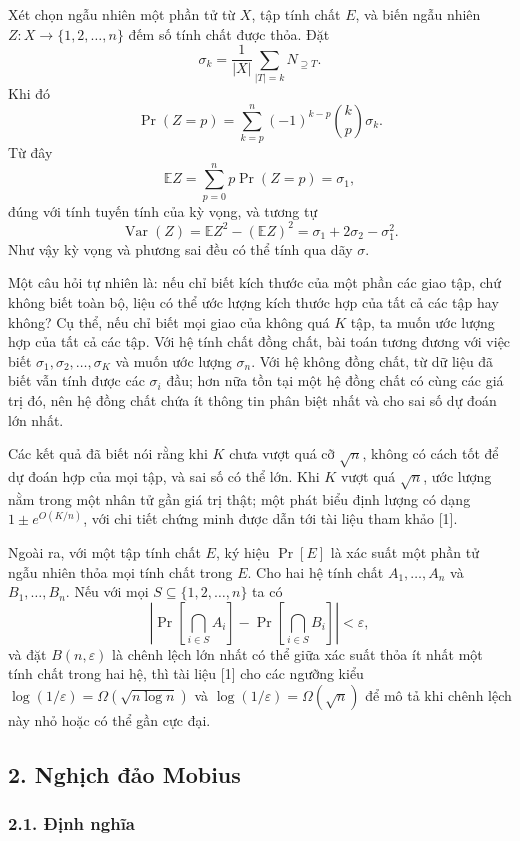\documentclass[11pt]{article}
\begin{document}
Xét chọn ngẫu nhiên một phần tử từ \(X\), tập tính chất \(E\), và biến ngẫu
nhiên \(Z:X\to\{1,2,\ldots,n\}\) đếm số tính chất được thỏa. Đặt
\[
\sigma_k=\frac1{|X|}\sum_{|T|=k}N_{\supseteq T}.
\]
Khi đó
\[
\Pr(Z=p)=\sum_{k=p}^n(-1)^{k-p}\binom kp\sigma_k.
\]
Từ đây
\[
\mathbb E Z=\sum_{p=0}^n p\Pr(Z=p)=\sigma_1,
\]
đúng với tính tuyến tính của kỳ vọng, và tương tự
\[
\operatorname{Var}(Z)=\mathbb E Z^2-(\mathbb E Z)^2
=\sigma_1+2\sigma_2-\sigma_1^2.
\]
Như vậy kỳ vọng và phương sai đều có thể tính qua dãy \(\sigma\).

Một câu hỏi tự nhiên là: nếu chỉ biết kích thước của một phần các giao tập, chứ
không biết toàn bộ, liệu có thể ước lượng kích thước hợp của tất cả các tập
hay không? Cụ thể, nếu chỉ biết mọi giao của không quá \(K\) tập, ta muốn ước
lượng hợp của tất cả các tập. Với hệ tính chất đồng chất, bài toán tương đương
với việc biết \(\sigma_1,\sigma_2,\ldots,\sigma_K\) và muốn ước lượng
\(\sigma_n\). Với hệ không đồng chất, từ dữ liệu đã biết vẫn tính được các
\(\sigma_i\) đầu; hơn nữa tồn tại một hệ đồng chất có cùng các giá trị đó, nên
hệ đồng chất chứa ít thông tin phân biệt nhất và cho sai số dự đoán lớn nhất.

Các kết quả đã biết nói rằng khi \(K\) chưa vượt quá cỡ \(\sqrt n\), không có
cách tốt để dự đoán hợp của mọi tập, và sai số có thể lớn. Khi \(K\) vượt quá
\(\sqrt n\), ước lượng nằm trong một nhân tử gần giá trị thật; một phát biểu
định lượng có dạng \(1\pm e^{O(K/n)}\), với chi tiết chứng minh được dẫn tới
tài liệu tham khảo [1].

Ngoài ra, với một tập tính chất \(E\), ký hiệu \(\Pr[E]\) là xác suất một phần
tử ngẫu nhiên thỏa mọi tính chất trong \(E\). Cho hai hệ tính chất
\(A_1,\ldots,A_n\) và \(B_1,\ldots,B_n\). Nếu với mọi
\(S\subseteq\{1,2,\ldots,n\}\) ta có
\[
\left|\Pr\left[\bigcap_{i\in S}A_i\right]
-\Pr\left[\bigcap_{i\in S}B_i\right]\right|<\varepsilon,
\]
và đặt \(B(n,\varepsilon)\) là chênh lệch lớn nhất có thể giữa xác suất thỏa
ít nhất một tính chất trong hai hệ, thì tài liệu [1] cho các ngưỡng kiểu
\(\log(1/\varepsilon)=\Omega(\sqrt{n\log n})\) và
\(\log(1/\varepsilon)=\Omega(\sqrt n)\) để mô tả khi chênh lệch này nhỏ hoặc
có thể gần cực đại.

\subsection*{2. Nghịch đảo Mobius}

\subsubsection*{2.1. Định nghĩa}
\end{document}
